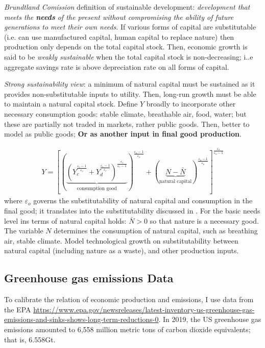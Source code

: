 \textit{Brundtland Comission} definition of sustainable development: \textit{development that meets the \textbf{needs} of the present without compromising the ability of future generations to meet their own needs}.
If various forms of capital are substitutable (i.e. can use manufactured capital, human capital to replace nature) then production only depends on the total capital stock. Then, economic growth is said to be \textit{weakly sustainable} when the total capital stock is non-decreasing; i..e aggregate savings rate is above depreciation rate on all forms of capital. 

\textit{Strong sustainability view}:  a minimum of natural capital must be sustained as it provides non-substitutable inputs to utility. Then, long-run growth must be able to maintain a natural capital stock.  
\ar Define $Y$ broadly to incorporate other necessary consumption goods: stable climate, breathable air, food, water; but these are partially not traded in markets, rather public goods. Then, better to model as public goods; \textbf{Or as another input in final good production}.

\begin{align*}
Y= \left[\left(\underbrace{\left(Y_c^{\frac{\varepsilon_c-1}{\varepsilon_c}}+Y_d^{\frac{\varepsilon_c-1}{\varepsilon_c}}\right)^{\frac{\varepsilon_c}{\varepsilon_c-1}}}_{\text{consumption  good}}\right)^{\frac{\varepsilon_o-1}{\varepsilon_o}}+(\underbrace{N-\bar{N}}_{\text{natural capital}})^{\frac{\varepsilon_o-1}{\varepsilon_o}}\right]^{\frac{\varepsilon_o}{\varepsilon_o-1}}
\end{align*} 
where $\varepsilon_o$  governs the substitutability of natural capital and consumption in the final good; it translates into the substitutability discussed in \cite{Cohen2019AnnualSubstitutable}. For the basic needs level ins terms of natural capital holds: $\bar{N}>0$ so that nature is a necessary good. The variable $N$ determines the consumption of natural capital, such as breathing air, stable climate.
Model technological growth on substitutability between natural capital (including nature as a waste), and other production inputs.  

 
\subsection{Greenhouse gas emissions Data}
To calibrate the relation of economic production and emissions, I use data from the EPA \url{https://www.epa.gov/newsreleases/latest-inventory-us-greenhouse-gas-emissions-and-sinks-shows-long-term-reductions-0}.
In 2019, the US greenhouse gas emissions amounted to 6,558 million metric tons of carbon dioxide equivalents; that is, 6.558Gt. 

